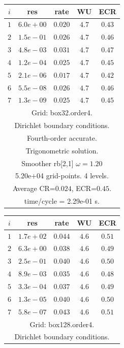\begin{table}[hbt]
\begin{center}
\begin{tabular}{|c|c|c|c|c|} \hline 
 $i$   & res      & rate    &  WU    & ECR  \\   \hline 
 $ 1$  & $ 6.0e+00$ & $0.020$ & $ 4.7$ & $0.43$ \\ 
 $ 2$  & $ 1.5e-01$ & $0.026$ & $ 4.7$ & $0.46$ \\ 
 $ 3$  & $ 4.8e-03$ & $0.031$ & $ 4.7$ & $0.47$ \\ 
 $ 4$  & $ 1.2e-04$ & $0.025$ & $ 4.7$ & $0.45$ \\ 
 $ 5$  & $ 2.1e-06$ & $0.017$ & $ 4.7$ & $0.42$ \\ 
 $ 6$  & $ 5.5e-08$ & $0.026$ & $ 4.7$ & $0.46$ \\ 
 $ 7$  & $ 1.3e-09$ & $0.025$ & $ 4.7$ & $0.45$ \\ 
\hline 
\multicolumn{5}{|c|}{Grid: box32.order4.}  \\
\multicolumn{5}{|c|}{Dirichlet boundary conditions.}  \\
\multicolumn{5}{|c|}{Fourth-order accurate.}  \\
\multicolumn{5}{|c|}{Trigonometric solution.}  \\
\multicolumn{5}{|c|}{Smoother rb[2,1] $\omega=1.20$}  \\
\multicolumn{5}{|c|}{5.20e+04 grid-points. 4 levels.}  \\
\multicolumn{5}{|c|}{Average CR=$0.024$, ECR=$0.45$.}  \\
\multicolumn{5}{|c|}{time/cycle = 2.29e-01 s.}  \\
\hline 
\end{tabular}
\begin{tabular}{|c|c|c|c|c|} \hline 
 $i$   & res      & rate    &  WU    & ECR  \\   \hline 
 $ 1$  & $ 1.7e+02$ & $0.044$ & $ 4.6$ & $0.51$ \\ 
 $ 2$  & $ 6.3e+00$ & $0.038$ & $ 4.6$ & $0.49$ \\ 
 $ 3$  & $ 2.5e-01$ & $0.040$ & $ 4.6$ & $0.50$ \\ 
 $ 4$  & $ 8.9e-03$ & $0.035$ & $ 4.6$ & $0.48$ \\ 
 $ 5$  & $ 3.3e-04$ & $0.037$ & $ 4.6$ & $0.49$ \\ 
 $ 6$  & $ 1.3e-05$ & $0.040$ & $ 4.6$ & $0.50$ \\ 
 $ 7$  & $ 5.8e-07$ & $0.043$ & $ 4.6$ & $0.51$ \\ 
\hline 
\multicolumn{5}{|c|}{Grid: box128.order4.}  \\
\multicolumn{5}{|c|}{Dirichlet boundary conditions.}  \\

\end{tabular}
\end{center}
\end{table}
